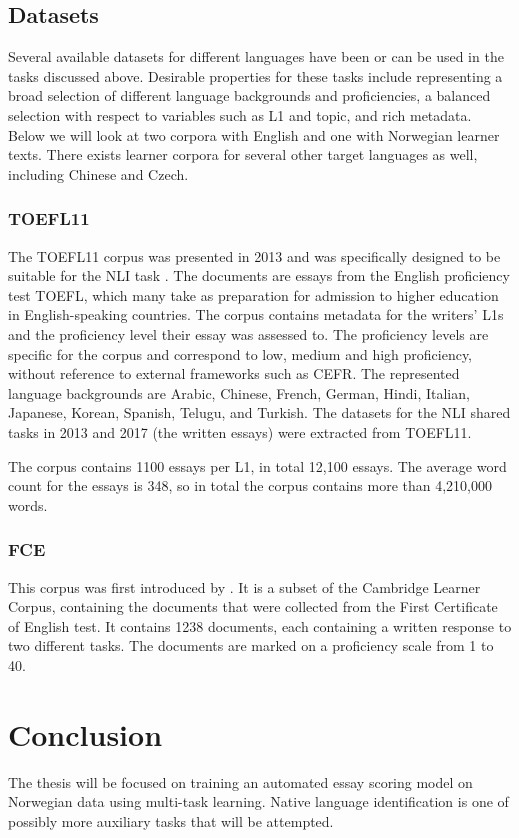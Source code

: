 \subsection{Datasets}

Several available datasets for different languages have been or can be used
in the tasks discussed above. Desirable properties for these tasks include
representing a broad selection of different language backgrounds and
proficiencies, a balanced selection with respect to variables such as L1 and
topic, and rich metadata. Below we will look at two corpora with English and
one with Norwegian learner texts. There exists learner corpora for several
other target languages as well, including Chinese and Czech.


\subsubsection{TOEFL11}

The TOEFL11 corpus was presented in 2013 and was specifically designed to be
suitable for the \ac{NLI} task \autocite{blanchard13}. The documents are
essays from the English proficiency test TOEFL, which many take as
preparation for admission to higher education in English-speaking countries.
The corpus contains metadata for the writers' L1s and the proficiency level
their essay was assessed to. The proficiency levels are specific for the
corpus and correspond to low, medium and high proficiency, without reference
to external frameworks such as \ac{CEFR}. The represented language
backgrounds are Arabic, Chinese, French, German, Hindi, Italian, Japanese,
Korean, Spanish, Telugu, and Turkish. The datasets for the \ac{NLI} shared
tasks in 2013 and 2017 (the written essays) were extracted from TOEFL11.

The corpus contains 1100 essays per L1, in total 12,100 essays. The average
word count for the essays is 348, so in total the corpus contains more than
4,210,000 words.


\subsubsection{FCE}

This corpus was first introduced by \textcite{yannakoudakis2011new}. It is a
subset of the Cambridge Learner Corpus, containing the documents that were
collected from the First Certificate of English test. It contains 1238
documents, each containing a written response to two different tasks. The
documents are marked on a proficiency scale from 1 to 40.


\section{Conclusion}

The thesis will be focused on training an automated essay scoring model on
Norwegian data using multi-task learning. Native language identification is
one of possibly more auxiliary tasks that will be attempted.
